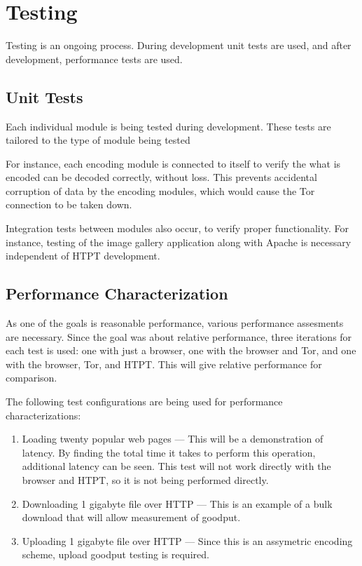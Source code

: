 \section{Testing}

Testing is an ongoing process. During development unit tests are used, and after development, performance tests are used. 

\subsection{Unit Tests}
Each individual module is being tested during development. These tests are tailored to the type of module being tested

For instance, each encoding module is connected to itself to verify the what is encoded can be decoded correctly, without loss. This prevents accidental corruption of data by the encoding modules, which would cause the Tor connection to be taken down.

Integration tests between modules also occur, to verify proper functionality. For instance, testing of the image gallery application along with Apache is necessary independent of HTPT development. 

\subsection{Performance Characterization}
As one of the goals is reasonable performance, various performance assesments are necessary. Since the goal was about relative performance, three iterations for each test is used: one with just a browser, one with the browser and Tor, and one with the browser, Tor, and HTPT. This will give relative performance for comparison. 

The following test configurations are being used for performance characterizations:  
\begin{enumerate}
  \item Loading twenty popular web pages --- This will be a demonstration of latency. By finding the total time it takes to perform this operation, additional latency can be seen. This test will not work directly with the browser and HTPT, so it is not being performed directly. 
  \item Downloading 1 gigabyte file over HTTP --- This is an example of a bulk download that will allow measurement of goodput.
  \item Uploading 1 gigabyte file over HTTP --- Since this is an assymetric encoding scheme, upload goodput testing is required.
\end{enumerate}

